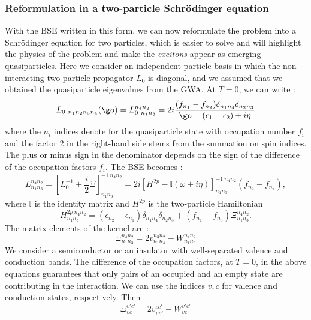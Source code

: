 \subsubsection{Reformulation in a two-particle Schrödinger equation}
With the \gls{BSE} written in this form, we can now reformulate the problem into a Schrödinger equation for two particles, which is easier to solve and will highlight the physics of the problem and make the \textit{excitons} appear as emerging quasiparticles. Here we consider an independent-particle basis in which the non-interacting two-particle propagator $L_0$ is diagonal, and we assumed that we obtained the quasiparticle eigenvalues from the \gls{GWA}. At $T=0$, we can write :
\begin{equation}
	L_{0\ n_1n_2n_3n_4}(\go) = L_{0\ n_1n_3}^{n_4n_2} = 2 i \frac{(f_{n_1} - f_{n_2}) \delta_{n_1n_4}\delta_{n_2n_3}}{\go - (\epsilon_1 - \epsilon_2) \pm i\eta}
\end{equation}
where the $n_i$ indices denote for the quasiparticle state with occupation number $f_i$ and the factor 2 in the right-hand side stems from the summation on spin indices. The plus or minus sign in the denominator depends on the sign of the difference of the occupation factors $f_i$. The \gls{BSE} becomes :
\begin{equation}
	L_{n_1n_3}^{n_4n_2} = \left[ L_0^{-1} + \frac{i}{2}\Xi\right]^{-1\ n_4n_2}_{n_1n_3} = 2i \left[ H^{2p} - \mathbb{I}(\omega \pm i\eta) \right]^{-1\ n_4n_2}_{n_1n_3}(f_{n_2} - f_{n_4}),
\end{equation}
where $\mathbb{I}$ is the identity matrix and $H^{2p}$ is the two-particle Hamiltonian 
\begin{equation}
	H^{2p\ n_4n_2}_{n_1n_3} = (\epsilon_{n_2} - \epsilon_{n_1}) \delta_{n_1n_4}\delta_{n_2n_3} + (f_{n_1} - f_{n_3}) \Xi_{n_1n_3}^{n_4n_2}. \label{eq:BSE_H2p}
\end{equation}
The matrix elements of the kernel are :
\begin{equation}
	\Xi_{n_1n_3}^{n_4n_2} = 2v_{n_1n_4}^{n_3n_2} - W_{n_1n_3}^{n_4n_2} \label{eq:GW-BSE_kernel}
\end{equation}
We consider a semiconductor or an insulator with well-separated valence and conduction bands. The difference of the occupation factors, at $T=0$, in the above equations guarantees that only pairs of an occupied and an empty state are contributing in the interaction. We can use the indices $v,c$ for valence and conduction states, respectively. Then
\begin{equation}
	\Xi^{v'c'}_{vc} = 2v^{cc'}_{vv'} - W^{v'c'}_{vc}
\end{equation}
